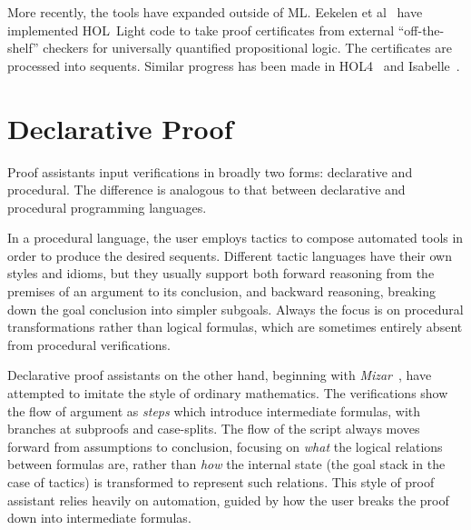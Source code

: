 More recently, the tools have expanded outside of ML. Eekelen et al~\cite{HOLLightBoolean} have implemented HOL~Light code to take proof certificates from external ``off-the-shelf'' checkers for universally quantified propositional logic. The certificates are processed into sequents. Similar progress has been made in HOL4~\cite{HOLBoolean} and Isabelle~\cite{IsabelleSledgehammer}.

\section{Declarative Proof}\label{sec:DeclarativeProof}
Proof assistants input verifications in broadly two forms: declarative and procedural. The difference is analogous to that between declarative and procedural programming languages. 

In a procedural language, the user employs tactics to compose automated tools in order to produce the desired sequents. Different tactic languages have their own styles and idioms, but they usually support both forward reasoning from the premises of an argument to its conclusion, and backward reasoning, breaking down the goal conclusion into simpler subgoals. Always the focus is on procedural transformations rather than logical formulas, which are sometimes entirely absent from procedural verifications. 



Declarative proof assistants on the other hand, beginning with \emph{Mizar}~\cite{MizarMathematicalVernacular}, have attempted to imitate the style of ordinary mathematics. The verifications show the flow of argument as \emph{steps} which introduce intermediate formulas, with branches at subproofs and case-splits. The flow of the script always moves forward from assumptions to conclusion, focusing on \emph{what} the logical relations between formulas are, rather than \emph{how} the internal state (the goal stack in the case of tactics) is transformed to represent such relations. This style of proof assistant relies heavily on automation, guided by how the user breaks the proof down into intermediate formulas.

